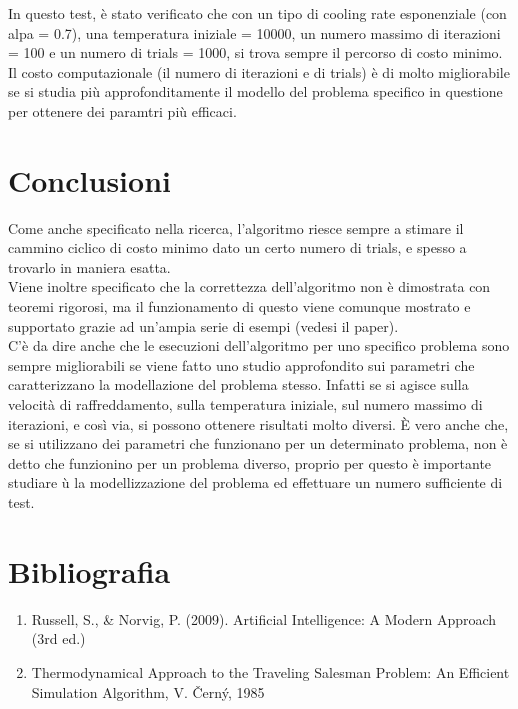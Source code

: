 \documentclass[11pt]{article}
\begin{document}
        In questo test, è stato verificato che con un tipo di cooling rate esponenziale (con alpa = 0.7), una temperatura iniziale = 10000,
        un numero massimo di iterazioni = 100 e un numero di trials = 1000, si trova sempre il percorso di costo minimo.
        Il costo computazionale (il numero di iterazioni e di trials) è di molto migliorabile se si studia più approfonditamente il modello
        del problema specifico in questione per ottenere dei paramtri più efficaci.

    \section{Conclusioni} \label{sec:conclusiona}

        Come anche specificato nella ricerca, l'algoritmo riesce sempre a stimare il cammino ciclico di costo minimo dato un certo numero di trials,
        e spesso a trovarlo in maniera esatta. \\
        Viene inoltre specificato che la correttezza dell'algoritmo non è dimostrata con teoremi rigorosi, ma il funzionamento di
        questo viene comunque mostrato e supportato grazie ad un'ampia serie di esempi (vedesi il paper). \\
        C'è da dire anche che le esecuzioni dell'algoritmo per uno specifico problema sono sempre migliorabili se viene fatto uno studio approfondito
        sui parametri che caratterizzano la modellazione del problema stesso. Infatti se si agisce sulla velocità di raffreddamento, sulla temperatura iniziale,
        sul numero massimo di iterazioni, e così via, si possono ottenere risultati molto diversi. È vero anche che, se si utilizzano dei parametri che
        funzionano per un determinato problema, non è detto che funzionino per un problema diverso, proprio per questo è importante studiare ù
        la modellizzazione del problema ed effettuare un numero sufficiente di test.

    \section{Bibliografia} \label{sec:bibliography}

        \begin{enumerate}
            \item Russell, S., & Norvig, P. (2009). Artificial Intelligence: A Modern Approach (3rd ed.)
            \item Thermodynamical Approach to the Traveling Salesman Problem: An Efficient Simulation Algorithm, V. Černý, 1985
        \end{enumerate}
\end{document}
